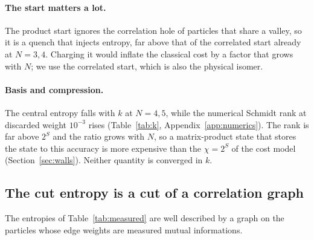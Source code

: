 \paragraph{The start matters a lot.} The product start ignores the correlation hole of particles that share a valley, so it is a quench that injects entropy, far above that of the correlated start already at $N=3,4$. Charging it would inflate the classical cost by a factor that grows with $N$; we use the correlated start, which is also the physical isomer.

\paragraph{Basis and compression.} The central entropy falls with $k$ at $N=4,5$, while the numerical Schmidt rank at discarded weight $10^{-3}$ rises (Table~\ref{tab:k}, Appendix~\ref{app:numerics}). The rank is far above $2^{S}$ and the ratio grows with $N$, so a matrix-product state that stores the state to this accuracy is more expensive than the $\chi=2^S$ of the cost model (Section~\ref{sec:walls}). Neither quantity is converged in $k$.

\subsection{The cut entropy is a cut of a correlation graph}
\label{sec:graph}

The entropies of Table~\ref{tab:measured} are well described by a graph on the particles whose edge weights are measured mutual informations.

